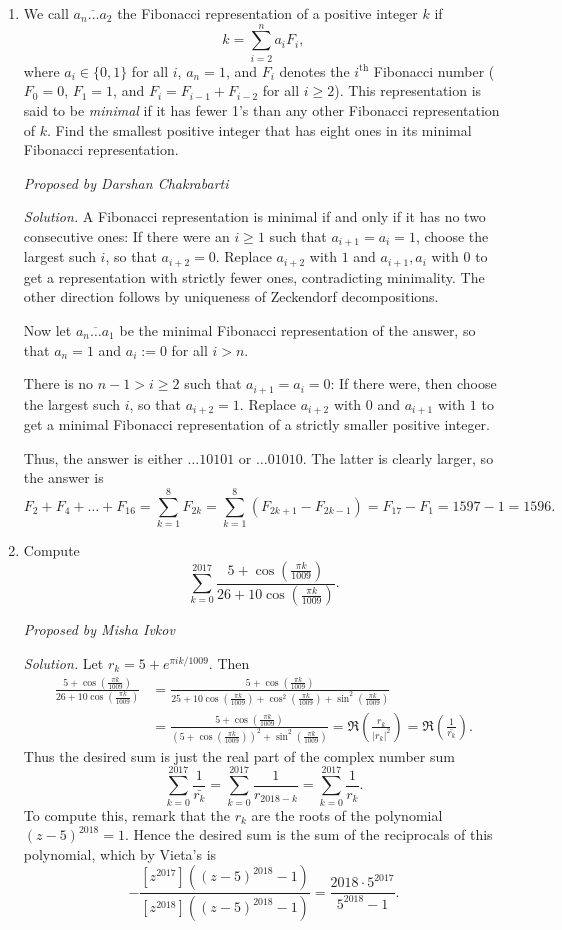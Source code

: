 \documentclass[10pt]{article}
\newcommand{\proposed}[1]
{
\vspace{5pt}
\noindent\textit{Proposed by #1}
}
\newcommand{\solution}
{
\vspace{5pt}
\noindent\textit{Solution.}\qquad
}
\begin{document}
\begin{enumerate}
\item We call $\overline{a_n\ldots a_2}$ the Fibonacci representation of a positive integer $k$ if \[k = \sum_{i=2}^n a_i F_i,\] where $a_i\in\{0,1\}$ for all $i$, $a_n=1$, and $F_i$ denotes the $i^{\text{th}}$ Fibonacci number ($F_0=0$, $F_1=1$, and $F_i=F_{i-1}+F_{i-2}$ for all $i\ge2$). This representation is said to be \textit{minimal} if it has fewer 1’s than any other Fibonacci representation of $k$. Find the smallest positive integer that has eight ones in its minimal Fibonacci representation. 

\proposed{Darshan Chakrabarti}

\solution A Fibonacci representation is minimal if and only if it has no two consecutive ones: If there were an $i\ge1$ such that $a_{i+1}=a_i=1$, choose the largest such $i$, so that $a_{i+2}=0$. Replace $a_{i+2}$ with $1$ and $a_{i+1},a_i$ with $0$ to get a representation with strictly fewer ones, contradicting minimality. The other direction follows by uniqueness of Zeckendorf decompositions.

Now let $\overline{a_n\ldots a_1}$ be the minimal Fibonacci representation of the answer, so that $a_n=1$ and $a_i:=0$ for all $i>n$.

There is no $n-1>i\ge2$ such that $a_{i+1}=a_i=0$: If there were, then choose the largest such $i$, so that $a_{i+2}=1$. Replace $a_{i+2}$ with $0$ and $a_{i+1}$ with $1$ to get a minimal Fibonacci representation of a strictly smaller positive integer.

Thus, the answer is either $\ldots10101$ or $\ldots01010$. The latter is clearly larger, so the answer is \[F_2+F_4+\dots+F_{16}=\sum_{k=1}^8F_{2k}=\sum_{k=1}^8(F_{2k+1}-F_{2k-1})=F_{17}-F_1=1597-1=\boxed{1596}.\] 

\item Compute
\[\sum_{k=0}^{2017}\dfrac{5+\cos\left(\frac{\pi k}{1009}\right)}{26+10\cos\left(\frac{\pi k}{1009}\right)}.\]

\proposed{Misha Ivkov}

\solution Let $r_k = 5 + e^{\pi ik/1009}$.  Then \begin{align*}\frac{5 + \cos(\frac{\pi k}{1009})}{26 + 10\cos(\frac{\pi k}{1009})} &= \frac{5 + \cos(\frac{\pi k}{1009})}{25 + 10\cos(\frac{\pi k}{1009}) + \cos^2(\frac{\pi k}{1009}) + \sin^2(\frac{\pi k}{1009})}\\&=\frac{5 + \cos(\frac{\pi k}{1009})}{(5 + \cos(\frac{\pi k}{1009}))^2 + \sin^2(\frac{\pi k}{1009})}=\Re\left(\frac{r_k}{|r_k|^2}\right) = \Re\left(\frac{1}{\bar{r_k}}\right).\end{align*} Thus the desired sum is just the real part of the complex number sum \[\sum_{k=0}^{2017}\frac{1}{\bar{r_k}} = \sum_{k = 0}^{2017}\frac{1}{r_{2018-k}} = \sum_{k=0}^{2017}\frac{1}{r_k}.\] To compute this, remark that the $r_k$ are the roots of the polynomial $(z-5)^{2018} = 1$.  Hence the desired sum is the sum of the reciprocals of this polynomial, which by Vieta's is \[-\frac{[z^{2017}]((z-5)^{2018} - 1)}{[z^{2018}]((z-5)^{2018} - 1)} = \boxed{\frac{2018\cdot 5^{2017}}{5^{2018} - 1}}.\]


\end{enumerate}
\end{document}
